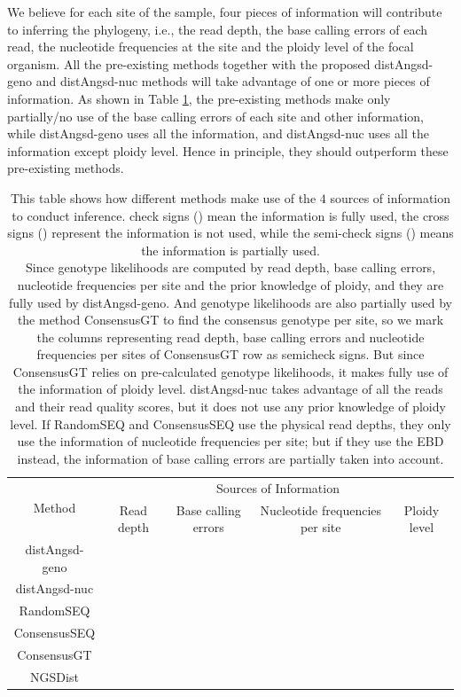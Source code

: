 \documentclass{article}
\newcommand{\tickYes}{\checkmark}
\newcommand{\tickNo}{\hspace{1pt}\ding{55}}
\newcommand{\tickHalfYes}{\checkmark\!\!\!\raisebox{0.4 em}{\tiny$\smallsetminus$}}
\begin{document}
We believe for each site of the sample, four pieces of information will contribute to inferring the phylogeny, i.e., the read depth, the base calling errors of each read, the nucleotide frequencies at the site and the ploidy level of the focal organism. All the pre-existing methods together with the proposed distAngsd-geno and distAngsd-nuc methods will take advantage of one or more pieces of information. As shown in Table \ref{tab:Information}, the pre-existing methods make only partially/no use of the base calling errors of each site and other information, while distAngsd-geno uses all the information, and distAngsd-nuc uses all the information except ploidy level. Hence in principle, they should outperform these pre-existing methods.
\begin{table}[ht]
    \centering
    \begin{tabular}{|c|cccc|}
     \hline
      \multirow{2}{*}{Method} & \multicolumn{4}{c|}{Sources of Information}\\
         &Read depth & Base calling errors & Nucleotide frequencies per site & Ploidy level\\
      \hline
      distAngsd-geno & \tickYes & \tickYes & \tickYes & \tickYes\\
      distAngsd-nuc & \tickYes & \tickYes & \tickYes & \tickNo\\
      RandomSEQ & \tickNo & \tickHalfYes & \tickYes & \tickNo\\
      ConsensusSEQ & \tickNo & \tickHalfYes & \tickYes & \tickNo\\
      ConsensusGT & \tickHalfYes & \tickHalfYes & \tickHalfYes & \tickYes\\
      NGSDist & \tickYes & \tickYes & \tickYes & \tickYes\\
      \hline
      \end{tabular}
    \caption{This table shows how different methods make use of the $4$ sources of information to conduct inference. check signs (\tickYes) mean the information is fully used, the cross signs (\tickNo) represent the information is not used, while the semi-check signs (\tickHalfYes) means the information is partially used. \\Since genotype likelihoods are computed by read depth, base calling errors, nucleotide frequencies per site and the prior knowledge of ploidy, and they are fully used by distAngsd-geno. And genotype likelihoods are also partially used by the method ConsensusGT to find the consensus genotype per site, so we mark the columns representing read depth, base calling errors and nucleotide frequencies per sites of ConsensusGT row as semicheck signs. But since ConsensusGT relies on pre-calculated genotype likelihoods, it makes fully use of the information of ploidy level. distAngsd-nuc takes advantage of all the reads and their read quality scores, but it does not use any prior knowledge of ploidy level. If RandomSEQ and ConsensusSEQ use the physical read depths, they only use the information of nucleotide frequencies per site; but if they use the EBD instead, the information of base calling errors are partially taken into account.}
    \label{tab:Information}
\end{table}
\end{document}
